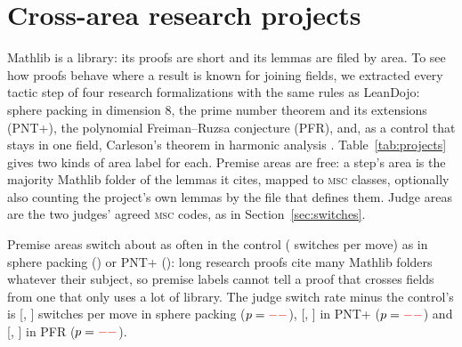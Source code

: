\section{Cross-area research projects}
\label{app:projects}

Mathlib is a library: its proofs are short and its lemmas are filed by area.
To see how proofs behave where a result is known for joining fields, we
extracted every tactic step of four research formalizations with the same
rules as LeanDojo: sphere packing in dimension 8, the prime number theorem and
its extensions (PNT+), the polynomial Freiman--Ruzsa conjecture (PFR), and, as a
control that stays in one field, Carleson's theorem in harmonic analysis
. Table~\ref{tab:projects} gives two kinds of area
label for each. Premise areas are free: a step's area is the majority Mathlib
folder of the lemmas it cites, mapped to \textsc{msc} classes, optionally also
counting the project's own lemmas by the file that defines them. Judge areas are
the two judges' agreed \textsc{msc} codes, as in Section~\ref{sec:switches}.

Premise areas switch about as often in the control
(\resCaseCarlesonPremRate{} switches per move) as in sphere packing
(\resCaseSpherePremRate{}) or PNT+ (\resCasePNTPremRate{}): long research
proofs cite many Mathlib folders whatever their subject, so premise labels
cannot tell a proof that crosses fields from one that only uses a lot of
library. The judge switch rate minus the control's is
\resCaseSphereVsCtlRate{} [\resCaseSphereVsCtlRateLo, \resCaseSphereVsCtlRateHi]
switches per move in sphere packing ($p = \textcolor{red}{--}$),
\resCasePNTVsCtlRate{} [\resCasePNTVsCtlRateLo, \resCasePNTVsCtlRateHi] in PNT+
($p = \textcolor{red}{--}$) and \resCasePFRVsCtlRate{}
[\resCasePFRVsCtlRateLo, \resCasePFRVsCtlRateHi] in PFR
($p = \textcolor{red}{--}$).

\begin{table}[t]
  \caption{Area switching in four research formalizations. Premise areas: all
  extracted steps, switches between consecutive labelled steps, pooled over
  moves; ``with own'' also labels the project's own lemmas by their file.
  Judge areas: proofs with at least two judge-labelled steps, each proof
  weighted equally, with the mean under the within-proof shuffle and the ratio
  of the two (below 1 means a proof's steps in one area come in runs). Carleson's
  theorem stays in harmonic analysis and is the control.}
  \label{tab:projects}
  \centering\small
  \setlength{\tabcolsep}{4pt}
\end{table}

